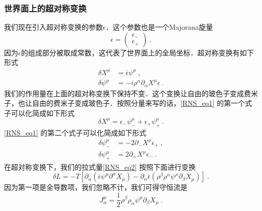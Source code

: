 \subsubsection{世界面上的超对称变换}
我们现在引入超对称变换的参数$\epsilon$．这个参数也是一个Majorana旋量
\begin{equation}
\epsilon = \begin{pmatrix}
\epsilon_- \\
\epsilon_+
\end{pmatrix}~.
\end{equation}
因为$\epsilon$的组成部分被取成常数，这代表了世界面上的全局坐标．超对称变换有如下形式
\begin{equation}\label{RNS_eq1}
\begin{aligned}
\delta X^\mu & = \bar \epsilon \psi^\mu ~, \\
\delta \psi^\mu & = - i \rho^\alpha \partial_\alpha X^\mu \epsilon ~.   
\end{aligned}
\end{equation}
我们的作用量在上面的超对称变换下保持不变．这个变换让自由的玻色子变成费米子，也让自由的费米子变成玻色子．按照分量来写的话，\autoref{RNS_eq1} 的第一个式子可以化简成如下形式
\begin{equation}
\delta X^\mu = \epsilon_- \psi_-^\mu + \epsilon_+ \psi_+^\mu~.
\end{equation}
\autoref{RNS_eq1} 的第二个式子可以化简成如下形式
\begin{equation}
\begin{aligned}
\delta \psi_-^\mu & = -2\partial_-X^\mu \epsilon_+ ~, \\
\delta \psi_+^\mu & = 2 \partial_+ X^\mu \epsilon_-~.
\end{aligned}
\end{equation}
在超对称变换下，我们的拉式量\autoref{RNS_eq2} 按照下面进行变换
\begin{equation}
\delta L = -T[ \partial_\alpha (\bar\epsilon\psi^\mu\partial^\alpha X_\mu) - \partial_\alpha \bar\epsilon (\rho^\beta\rho^\alpha\psi^\mu\partial_\beta X_\mu) ] ~.
\end{equation}
因为第一项是全导数项，我们忽略不计，我们可得守恒流是
\begin{equation}
J^\mu_\alpha = \frac{1}{2} \rho^\beta \rho_\alpha \psi^\mu \partial_\beta X_\mu ~.
\end{equation}

